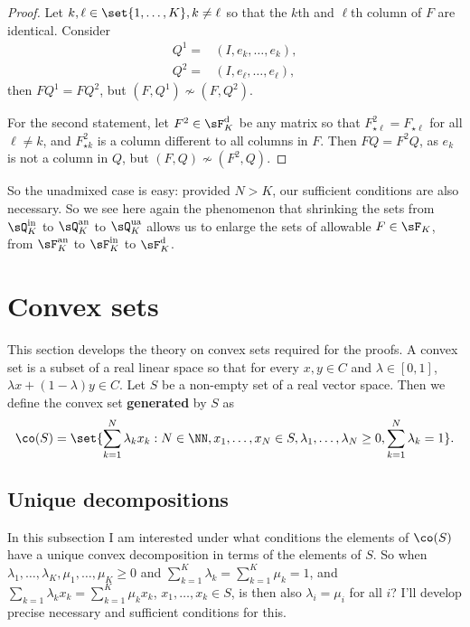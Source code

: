 \documentclass[12pt,a4paper]{article}
\begin{document}
\begin{proof}
Let $k,\ell\in\set{1,\ldots,K},k\neq \ell$ so that the $k$th and $\ell$th column of $F$ are identical. Consider \begin{align*}
    Q^1 = & (I, e_k,\ldots,e_k),\\
    Q^2 = & (I,e_\ell,\ldots,e_\ell),
\end{align*} 
then $FQ^1=FQ^2$, but $(F,Q^1)\not\sim (F,Q^2)$. 
    
    For the second statement, let $F^2\in\sF_K^{\text d}$ be any matrix so that $F^2_{\star \ell}=F_{\star \ell}$ for all $\ell\neq k$, and  $F^2_{\star k}$ is a column different to all columns in $F$. Then $FQ=F^2Q$, as $e_k$ is not a column in $Q$, but $(F,Q)\not\sim (F^2,Q)$.  
\end{proof}
So the unadmixed case is easy: provided $N>K$, our sufficient conditions are also necessary.  So we see here again the phenomenon that shrinking the sets from $\sQ_K^{\text{in}}$ to $\sQ_K^{\text{an}}$ to $\sQ_K^{\text{ua}}$ allows us to enlarge the sets of allowable $F\in\sF_K$, from $\sF_K^{\text{an}}$ to  $\sF_K^{\text{in}}$ to $\sF_K^{\text{d}}$.  

\appendix


\section{Convex sets}\label{sec:convexsets}

This section develops the theory on convex sets required for the proofs. 
A convex set is a subset of a real linear space so that for every $x,y\in C$ and $\lambda\in[0,1]$, $\lambda x + (1-\lambda)y\in C$.  
Let $S$ be a non-empty set of a real vector space. Then we define the convex set \textbf{generated} by $S$ as 
\begin{equation}\label{def:convexhull}
\co(S)= \set{\sum_{k=1}^N\lambda_k x_k: N\in\NN, x_1,\ldots,x_N\in S, \lambda_1,\ldots,\lambda_N\ge 0, \sum_{k=1}^N\lambda_k=1}. 
\end{equation}


\subsection{Unique decompositions}

In this subsection I am interested under what conditions the elements of $\co(S)$ have a unique convex decomposition in terms of the elements of $S$. So when $\lambda_1,\ldots,\lambda_K,\mu_1,\ldots,\mu_K\ge 0$ and $\sum_{k=1}^K\lambda_k=\sum_{k=1}^K \mu_k=1$, and $\sum_{k=1}\lambda_kx_k=\sum_{k=1}^K \mu_kx_k$, $x_1,\ldots,x_k\in S$, is then also $\lambda_i=\mu_i$ for all $i$? I'll develop precise necessary and sufficient conditions for this. 
\end{document}
